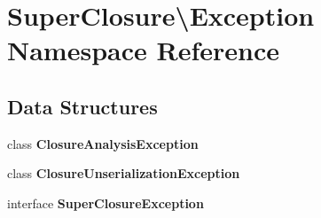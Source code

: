 \section{Super\+Closure\textbackslash{}Exception Namespace Reference}
\label{namespace_super_closure_1_1_exception}
\subsection*{Data Structures}
\begin{DoxyCompactItemize}
\item 
class {\bf Closure\+Analysis\+Exception}
\item 
class {\bf Closure\+Unserialization\+Exception}
\item 
interface {\bf Super\+Closure\+Exception}
\end{DoxyCompactItemize}
